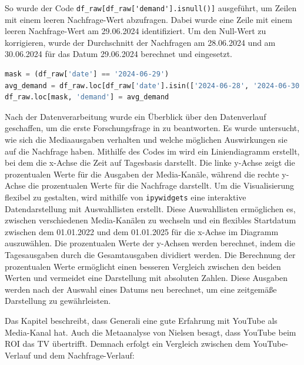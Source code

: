 So wurde der Code \verb|df_raw[df_raw['demand'].isnull()]| ausgeführt, um Zeilen mit einem leeren Nachfrage-Wert abzufragen. Dabei wurde eine Zeile mit einem leeren Nachfrage-Wert am 29.06.2024 identifiziert. Um den Null-Wert zu korrigieren, wurde der Durchschnitt der Nachfragen am 28.06.2024 und am 30.06.2024 für das Datum 29.06.2024 berechnet und eingesetzt.  
\begin{lstlisting}[language=Python, linewidth=\textwidth]
mask = (df_raw['date'] == '2024-06-29')
avg_demand = df_raw.loc[df_raw['date'].isin(['2024-06-28', '2024-06-30']), 'demand'].mean()
df_raw.loc[mask, 'demand'] = avg_demand
\end{lstlisting}
Nach der Datenverarbeitung wurde ein Überblick über den Datenverlauf geschaffen, um die erste Forschungsfrage in 
zu beantworten. Es wurde untersucht, wie sich die Mediaausgaben verhalten und welche möglichen Auswirkungen sie auf die Nachfrage haben. Mithilfe des Codes im  wird ein Liniendiagramm erstellt, bei dem die x-Achse die Zeit auf Tagesbasis darstellt. Die linke y-Achse zeigt die prozentualen Werte für die Ausgaben der Media-Kanäle, während die rechte y-Achse die prozentualen Werte für die Nachfrage darstellt. Um die Visualisierung flexibel zu gestalten, wird mithilfe von \verb|ipywidgets| eine interaktive Datendarstellung mit Auswahllisten erstellt. Diese Auswahllisten ermöglichen es, zwischen verschiedenen Media-Kanälen zu wechseln und ein flexibles Startdatum zwischen dem 01.01.2022 und dem 01.01.2025 für die x-Achse im Diagramm auszuwählen. Die prozentualen Werte der y-Achsen werden berechnet, indem die Tagesausgaben durch die Gesamtausgaben dividiert werden. Die Berechnung der prozentualen Werte ermöglicht einen besseren Vergleich zwischen den beiden Werten und vermeidet eine Darstellung mit absoluten Zahlen. Diese Ausgaben werden nach der Auswahl eines Datums neu berechnet, um eine zeitgemäße Darstellung zu gewährleisten. \par
Das Kapitel  beschreibt, dass Generali eine gute Erfahrung mit YouTube als Media-Kanal hat. Auch die Metaanalyse von Nielsen besagt, dass YouTube beim \ac{ROI} das TV übertrifft. Demnach erfolgt ein Vergleich zwischen dem YouTube-Verlauf und dem Nachfrage-Verlauf: \par

